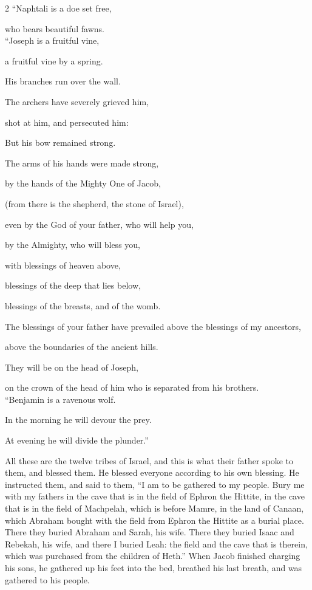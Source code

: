 \begin{multicols}{2}
	\myverse{}“Naphtali is a doe set free,
	
	who bears beautiful fawns. 
	\\
	
	\myverse{}“Joseph is a fruitful vine,
	
	a fruitful vine by a spring.
	
	His branches run over the wall.
	
	\myverse{}The archers have severely grieved him,
	
	shot at him, and persecuted him:
	
	\myverse{}But his bow remained strong.
	
	The arms of his hands were made strong,
	
	by the hands of the Mighty One of Jacob,
	
	(from there is the shepherd, the stone of Israel),
	
	\myverse{}even by the God of your father, who will help you,
	
	by the Almighty, who will bless you,
	
	with blessings of heaven above,
	
	blessings of the deep that lies below,
	
	blessings of the breasts, and of the womb.
	
	\myverse{}The blessings of your father have prevailed above the blessings of my ancestors,
	
	above the boundaries of the ancient hills.
	
	They will be on the head of Joseph,
	
	on the crown of the head of him who is separated from his brothers.
	\\ 
	
	\myverse{}“Benjamin is a ravenous wolf.
	
	In the morning he will devour the prey.
	
	At evening he will divide the plunder.”
\end{multicols}

\myverse{}All these are the twelve tribes of Israel, and this is what their father spoke to them, and blessed them. He blessed everyone according to his own blessing. \myverse{}He instructed them, and said to them, “I am to be gathered to my people. Bury me with my fathers in the cave that is in the field of Ephron the Hittite, \myverse{}in the cave that is in the field of Machpelah, which is before Mamre, in the land of Canaan, which Abraham bought with the field from Ephron the Hittite as a burial place. \myverse{}There they buried Abraham and Sarah, his wife. There they buried Isaac and Rebekah, his wife, and there I buried Leah: \myverse{}the field and the cave that is therein, which was purchased from the children of Heth.” \myverse{}When Jacob finished charging his sons, he gathered up his feet into the bed, breathed his last breath, and was gathered to his people.

